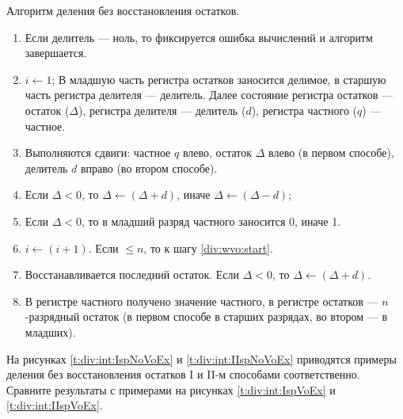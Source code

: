 Алгоритм деления без восстановления остатков.
\begin{enumerate}
	\item Если делитель --- ноль, то фиксируется ошибка вычислений и алгоритм завершается.
	\item $i\gets 1$; В младшую часть регистра остатков заносится делимое, в старшую часть регистра делителя --- делитель. Далее состояние регистра остатков --- остаток ($\Delta$), регистра делителя --- делитель ($d$), регистра частного ($q$) --- частное.
	\item\label{div:wvo:start} Выполняются сдвиги: частное $q$ влево, остаток $\Delta$ влево (в первом способе), делитель $d$ вправо (во втором способе).
	\item Если $\Delta < 0$, то $\Delta\gets(\Delta + d)$, иначе $\Delta\gets(\Delta - d)$;
	\item Если $\Delta < 0$, то в младший разряд частного заносится 0, иначе 1.
	\item $i\gets (i + 1)$. Если $\le n$, то к шагу \ref{div:wvo:start}.
	\item Восстанавливается последний остаток. Если $\Delta < 0$, то $\Delta\gets(\Delta + d)$.
	\item В регистре частного получено значение частного, в регистре остатков --- $n$-разрядный остаток (в первом способе в старших разрядах, во втором --- в младших).
\end{enumerate}


На рисунках \ref{t:div:int:IspNoVoEx} и \ref{t:div:int:IIspNoVoEx} приводятся примеры деления без восстановления остатков I и II-м способами соответственно. Сравните результаты с примерами на рисунках \ref{t:div:int:IspVoEx} и \ref{t:div:int:IIspVoEx}.

